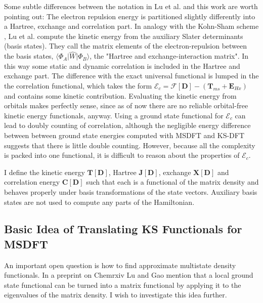 \documentclass[journal=jpclcd,manuscript=letter]{achemso}
\newcommand\m[1]{\mathbf{#1}}
\begin{document}
Some subtle differences between the notation in Lu et al. \cite{Lu2022JPCL,Lu2022JCTC} and this work are worth pointing out:
The electron repulsion energy is partitioned slightly differently into a Hartree, exchange and correlation part.
In analogy with the Kohn-Sham scheme \cite{Kohn1965}, Lu et al. compute the kinetic energy from the auxiliary Slater determinants (basis states).
They call the matrix elements of the electron-repulsion between the basis states,
$\langle \Phi_A \vert \hat{W} \vert \Phi_B \rangle$, the "Hartree and exchange-interaction matrix".
In this way some static and dynamic correlation is included in the Hartree and exchange part.
The difference with the exact universal functional is lumped in the the correlation functional, which takes the
form $\mathcal{E}_c = \mathcal{F}[\m{D}] - (\m{T}_{ms} + \m{E}_{Hx})$ \cite[Eqn.~(22)]{Lu2022JPCL}
and contains some kinetic contribution.
Evaluating the kinetic energy from orbitals
makes perfectly sense, since as of now there are no reliable orbital-free kinetic energy functionals, anyway.
Using a ground state functional for $\mathcal{E}_c$ can lead to doubly counting of correlation,
although the negligible energy difference between between ground state energies computed with MSDFT and KS-DFT
suggests that there is little double counting. \cite{Zhu2023} However, because all the complexity is packed into one
functional, it is difficult to reason about the properties of $\mathcal{E}_c$.

I define the kinetic energy $\m{T}[\m{D}]$, Hartree $\m{J}[\m{D}]$, exchange $\m{X}[\m{D}]$ and correlation energy
$\m{C}[\m{D}]$ such that each is a functional of the matrix density and behaves properly under basis transformations
of the state vectors.
Auxiliary basis states are not used to compute any parts of the Hamiltonian.

\subsection{Basic Idea of Translating KS Functionals for MSDFT
\label{sec:basic_ideas_Taylor_series}
}
An important open question is how to find approximate multistate density functionals. 
In a preprint on Chemrxiv \cite{lu_gao_2021_chemrxiv} Lu and Gao mention that a local ground state functional
can be turned into a matrix functional by applying it to the eigenvalues of the matrix density.
I wish to investigate this idea further.
\end{document}
